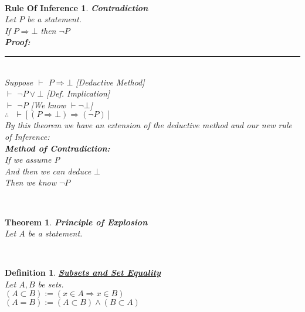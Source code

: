 \documentclass[12pt]{extarticle}
\theoremstyle{plain}
\newtheorem{thm}{Theorem}[section]
\theoremstyle{plain}
\theoremstyle{plain}
\theoremstyle{Definition}
\newtheorem{def.}{Definition}[section]
\theoremstyle{Definition}
\theoremstyle{plain}
\theoremstyle{plain}
\newtheorem{ruleOfInference}{Rule Of Inference}[section]
\newcommand{\cut}[0]{\noindent\framebox[\linewidth]{\rule{\linewidth}{2pt}}\\}
\newcommand{\prof}[0]{	\noindent \textbf{Proof:} \rule{500pt}{2pt} \\ }
\newcommand{\ddash}{\boxed{\vdash} }
\begin{document}
\cut 
\begin{ruleOfInference} \textbf{Contradiction} \\ 
	Let $P$ be a statement. \\ 
	If $P \Rightarrow \bot$ then $\lnot P$ \\ 
	\prof 
	Suppose  $\ddash$ $P \Rightarrow \bot$ \hfill [Deductive Method] \\
	$\ddash$ $\lnot P \lor \bot$ \hfill [Def. Implication] \\ 
	$\ddash$ $\lnot P$ \hfill [We know $\vdash \lnot \bot$] \\
	$\therefore \text{ } \vdash [(P \Rightarrow \bot) \Rightarrow (\lnot P)]$ \\
	By this theorem we have an extension of the deductive method and our new rule of Inference:\\
	\textbf{Method of Contradiction: }\\
	If we assume P \\
	And then we can deduce $\bot$ \\ 
	Then we know $\lnot P$ 
\end{ruleOfInference}
\cut
\begin{thm} \textbf{Principle of Explosion} \\ 
	Let $A$ be a statement. \\
\end{thm}
\cut
\begin{def.} \underline{\textbf{Subsets and Set Equality}} \\ 
	Let $A,B$ be sets. \\ 
	$(A \subset B) := (x \in A \Rightarrow x \in B)$ \\
	$(A = B) := (A \subset B) \wedge (B \subset A)$
\end{def.}
\cut
\end{document}
